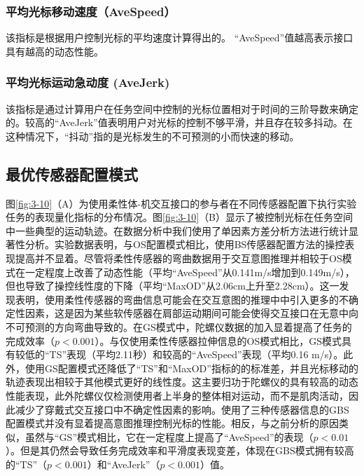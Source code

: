  \subsubsection{平均光标移动速度（AveSpeed）}该指标是根据用户控制光标的平均速度计算得出的。 “AveSpeed”值越高表示接口具有越高的动态性能。
 \subsubsection{平均光标运动急动度 (AveJerk) }该指标是通过计算用户在任务空间中控制的光标位置相对于时间的三阶导数来确定的。较高的``AveJerk''值表明用户对光标的控制不够平滑，并且存在较多抖动。在这种情况下，``抖动''指的是光标发生的不可预测的小而快速的移动。  

\subsection{最优传感器配置模式}图\ref{fig:3-10}（A）为使用柔性体-机交互接口的参与者在不同传感器配置下执行实验任务的表现量化指标的分布情况。图\ref{fig:3-10}（B）显示了被控制光标在任务空间中一些典型的运动轨迹。在数据分析中我们使用了单因素方差分析方法进行统计显著性分析。实验数据表明，与OS配置模式相比，使用BS传感器配置方法的操控表现提高并不显着。尽管将柔性传感器的弯曲数据用于交互意图推理并相较于OS模式在一定程度上改善了动态性能（平均``AveSpeed''从0.141m/s增加到0.149m/s），但也导致了操控线性度的下降（平均``MaxOD''从2.06cm上升至2.28cm）。这一发现表明，使用柔性传感器的弯曲信息可能会在交互意图的推理中中引入更多的不确定性因素，这是因为某些软传感器在肩部运动期间可能会使得交互接口在无意中向不可预测的方向弯曲导致的。在GS模式中，陀螺仪数据的加入显着提高了任务的完成效率（$p<0.001$）。与仅使用柔性传感器拉伸信息的OS模式相比，GS模式具有较低的``TS''表现（平均2.11秒）和较高的``AveSpeed''表现（平均0.16 m/s）。此外，使用GS配置模式还降低了``TS''和``MaxOD''指标的的标准差，并且光标移动的轨迹表现出相较于其他模式更好的线性度。这主要归功于陀螺仪的具有较高的动态性能表现，此外陀螺仪仅检测使用者上半身的整体相对运动，而不是肌肉活动，因此减少了穿戴式交互接口中不确定性因素的影响。使用了三种传感器信息的GBS配置模式并没有显着提高意图推理控制光标的性能。相反，与之前分析的原因类似，虽然与``GS''模式相比，它在一定程度上提高了``AveSpeed''的表现（$p<0.01$）。但是其仍然会导致任务完成效率和平滑度表现变差，体现在GBS模式拥有较高的``TS''（$p<0.001$）和``AveJerk''（$p<0.001$）值。

